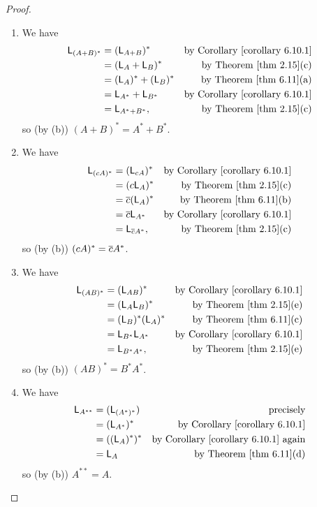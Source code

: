\begin{proof} \

\begin{enumerate}
\item We have
\begin{align*}
        \LMTRAN_{(A + B)^*} & = (\LMTRAN_{A + B})^* & \text{by \CORO{6.10.1}} \\
        & = (\LMTRAN_A + \LMTRAN_B)^* & \text{by \THM{2.15}(c)} \\
        & = (\LMTRAN_A)^* + (\LMTRAN_B)^* & \text{by \THM{6.11}(a)} \\
        & = \LMTRAN_{A^*} + \LMTRAN_{B^*} & \text{by \CORO{6.10.1}} \\
        & = \LMTRAN_{A^* + B^*}, & \text{by \THM{2.15}(c)}
\end{align*}
so (by (b)) \((A + B)^* = A^* + B^*\).

\item We have
\begin{align*}
        \LMTRAN_{(cA)^*} & = (\LMTRAN_{cA})^* & \text{by \CORO{6.10.1}} \\
        & = (c\LMTRAN_A)^* & \text{by \THM{2.15}(c)} \\
        & = \conjugatet{c}(\LMTRAN_A)^* & \text{by \THM{6.11}(b)} \\
        & = \conjugatet{c}\LMTRAN_{A^*} & \text{by \CORO{6.10.1}} \\
        & = \LMTRAN_{\conjugatet{c}A^*}, & \text{by \THM{2.15}(c)}
\end{align*}
so (by (b)) \((cA)^* = \overline{c}A^*\).

\item We have
\begin{align*}
    \LMTRAN_{(AB)^*} & = (\LMTRAN_{AB})^* & \text{by \CORO{6.10.1}} \\
        & = (\LMTRAN_A \LMTRAN_B)^* & \text{by \THM{2.15}(e)} \\
        & = (\LMTRAN_B)^*(\LMTRAN_A)^* & \text{by \THM{6.11}(c)} \\
        & = \LMTRAN_{B^*} \LMTRAN_{A^*} & \text{by \CORO{6.10.1}} \\
        & = \LMTRAN_{B^* A^*}, & \text{by \THM{2.15}(e)}
\end{align*}
so (by (b)) \((AB)^* = B^* A^*\).

\item We have
\begin{align*}
    \LMTRAN_{A^{**}} & = (\LMTRAN_{(A^*)^*}) & \text{precisely} \\
        & = (\LMTRAN_{A^*})^* & \text{by \CORO{6.10.1}} \\
        & = ((\LMTRAN_A)^*)^* & \text{by \CORO{6.10.1} again} \\
        & = \LMTRAN_A & \text{by \THM{6.11}(d)}
\end{align*}
so (by (b)) \(A^{**} = A\).


\end{enumerate}
\end{proof}
